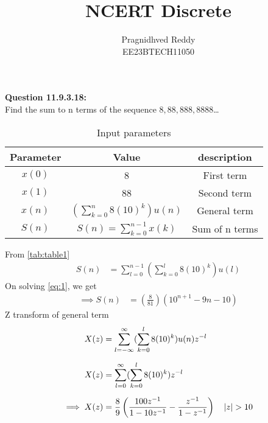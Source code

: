 \documentclass[journal,12pt,twocolumn]{IEEEtran}
\title{NCERT Discrete}
\author{Pragnidhved Reddy\\EE23BTECH11050}
\date{}
\begin{document}
\maketitle
\newpage
\bigskip
\textbf{Question 11.9.3.18:}\\
 Find the sum to n terms of the sequence $8,88,888,8888$\ldots\\
 \solution
\begin{table}[H]
\centering
\setlength{\extrarowheight}{8pt}
\begin{tabular}{|c|c|c|}\hline
\textbf{Parameter} & \textbf{Value} & \textbf{description}\\ \hline
$x(0)$ & 8 & First term \\ \hline
$x(1)$ & 88 & Second term \\ \hline 
$x(n)$ & $(\sum^{n}_{k=0}8(10)^k)u(n)$ & General term \\ \hline
$S(n)$ & $S(n)=\sum^{n-1}_{k=0}x(k)$ & Sum of n terms \\ \hline
\end{tabular}
\caption{Input parameters}
\label{tab:table1}
\end{table}
 From \eqref{tab:table1}
\begin{align}
\label{eq:1}
 S(n)&=\sum^{n-1}_{l=0}(\sum^{l}_{k=0}8(10)^k)u(l)
 \end{align}
 On solving \eqref{eq:1}, we get
 \begin{align}
 \implies S(n)&=\left(\frac{8}{81}\right)(10^{n+1}-9n-10)
 \end{align}
 Z transform of general term
 \begin{align}
 X(z)&=\sum_{l=-\infty}^{\infty}(\sum_{k=0}^{l}8(10)^k)u(n)z^{-l}\\[6pt]
 X(z)&=\sum_{l=0}^{\infty}(\sum_{k=0}^{l}8(10)^k)z^{-l}\\[6pt]
 \implies X(z)&=\frac{8}{9}\left(\frac{100z^{-1}}{1-10z^{-1}}-\frac{z^{-1}}{1-z^{-1}}\right) \quad \left\vert z\right\vert>10
 \end{align}
 
\end{document}
